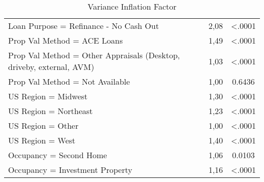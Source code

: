 \begin{table}[H]
\begin{tabular}{p{8cm}cc}
Loan Purpose = Refinance - No Cash Out 											 & 2,08                             & \textless{}.0001                     \\
Prop Val Method = ACE Loans                                                      & 1,49                             & \textless{}.0001                     \\
Prop Val Method = Other Appraisals (Desktop, driveby, external, AVM)             & 1,03                             & \textless{}.0001                     \\
Prop Val Method = Not Available                                                  & 1,00                             & 0.6436                               \\
US Region = Midwest                                                              & 1,30                             & \textless{}.0001                     \\
US Region = Northeast                                                            & 1,23                             & \textless{}.0001                     \\
US Region = Other                                                                & 1,00                             & \textless{}.0001                     \\
US Region = West                                                                 & 1,40                             & \textless{}.0001                     \\
Occupancy = Second Home                                                          & 1,06                             & 0.0103                               \\
Occupancy = Investment Property                                                  & 1,16                             & \textless{}.0001                    \\\bottomrule
\end{tabular}
\caption{Variance Inflation Factor}
\label{tab:re_vif}   
\end{table}

